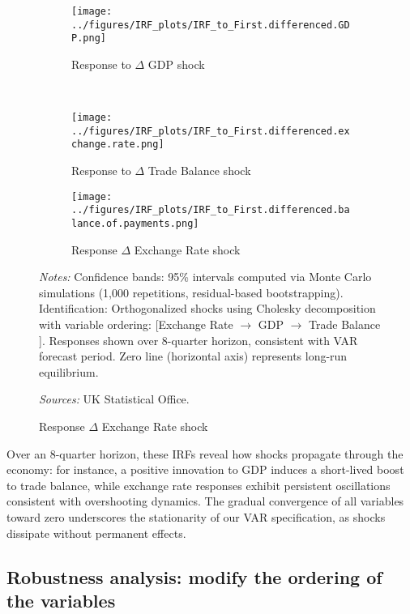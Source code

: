 \documentclass[
]{article}
\begin{document}
\begin{figure}[!htbp]
\centering
\caption{\textsc{Impulse Response Functions}}
\label{fig:irf1}

\begin{subfigure}[b]{0.32\textwidth}
    \centering
    \texttt{[image: ../figures/IRF\_plots/IRF\_to\_First.differenced.GDP.png]}
    \caption{Response to $\Delta$ GDP shock}
    \label{fig:irf_gdp}
\end{subfigure}
\\
\begin{subfigure}[b]{0.32\textwidth}
    \centering
    \texttt{[image: ../figures/IRF\_plots/IRF\_to\_First.differenced.exchange.rate.png]}
    \caption{Response to $\Delta$ Trade Balance shock}
    \label{fig:irf_tb}
\end{subfigure}
\begin{subfigure}[b]{0.32\textwidth}
    \centering
    \texttt{[image: ../figures/IRF\_plots/IRF\_to\_First.differenced.balance.of.payments.png]}
    \caption{Response $\Delta$ Exchange Rate shock}
    \label{fig:irf_fx}
\end{subfigure}

\begin{minipage}{\textwidth}
\footnotesize
\textit{Notes:} Confidence bands: 95\% intervals computed via Monte Carlo simulations (1,000 repetitions, residual-based bootstrapping).
Identification: Orthogonalized shocks using Cholesky decomposition with variable ordering: 
    [Exchange Rate $\rightarrow$ GDP $\rightarrow$ Trade Balance ]. Responses shown over 8-quarter horizon, 
    consistent with VAR forecast period.
    Zero line (horizontal axis) represents long-run equilibrium.


\textit{Sources:} UK Statistical Office.
\end{minipage}
\end{figure}

Over an 8-quarter horizon, these IRFs reveal how shocks propagate
through the economy: for instance, a positive innovation to GDP induces a 
short-lived boost to trade balance, while exchange rate responses exhibit 
persistent oscillations consistent with overshooting dynamics. The gradual 
convergence of all variables toward zero underscores the stationarity of our 
VAR specification, as shocks dissipate without permanent effects.

\subsection{Robustness analysis: modify the ordering of the variables}
\end{document}
